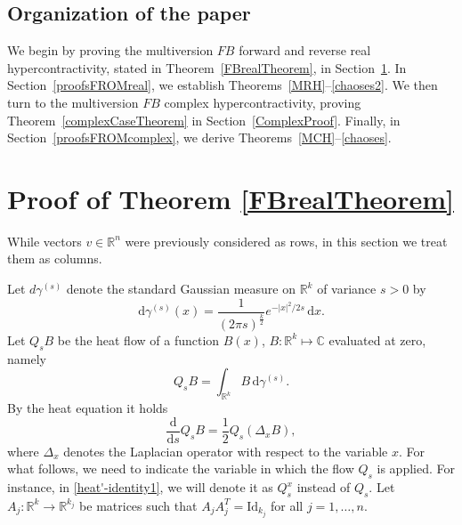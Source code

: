 \documentclass[9pt, a4paper]{amsart}
\newcommand{\R}{\mathbb{R}}
\newcommand{\1}{{\chi_{}}}%
\numberwithin{equation}{section}
\begin{document}
\subsection{Organization of the paper}

We begin by proving the multiversion $FB$ forward and reverse real hypercontractivity, stated in Theorem~\ref{FBrealTheorem}, in Section~\ref{reverseProof}. In Section~\ref{proofsFROMreal}, we establish Theorems~\ref{MRH}--\ref{chaoses2}. We then turn to the multiversion $FB$ complex hypercontractivity, proving Theorem~\ref{complexCaseTheorem} in Section~\ref{ComplexProof}. Finally, in Section~\ref{proofsFROMcomplex}, we derive Theorems~\ref{MCH}--\ref{chaoses}.





\section{\textbf{Proof of Theorem \ref{FBrealTheorem}}}\label{reverseProof}

While vectors $v \in \mathbb{R}^{n}$ were previously considered as rows, in this section we treat them as columns.
 
Let $d\gamma^{(s)}$ denote the  standard Gaussian measure on $\R^k$ of variance $s>0$ by
\begin{equation*}
\mathrm{d}\gamma^{(s)}(x)=\frac{1}{(2\pi s)^{\frac{k}{2}}}e^{-|x|^2/2s}\,\mathrm{d}x. 
\end{equation*}	
Let $Q_sB$ be the heat flow of a function $B(x)$,  $B:\R^k \mapsto \mathbb{C}$ evaluated at zero, namely 
\begin{equation}\label{heat flow}
	Q_sB=\int_{\R^k} 
	B\,\mathrm{d}\gamma^{(s)}.
\end{equation}
By the heat equation it holds
\begin{equation}\label{heat'-identity1}
	\frac{\mathrm{d}}{\mathrm{d}s}Q_sB=\frac{1}{2}Q_s(\Delta_x B),
\end{equation}
where $\Delta_x$ denotes the Laplacian operator with respect to the variable $x$. For what follows, we need to indicate the variable in which the flow $Q_s$ is applied. For instance, in \eqref{heat'-identity1}, we will denote it as $Q_s^x$ instead of $Q_s$. Let $A_{j} : \mathbb{R}^{k}\to \mathbb{R}^{k_{j}}$ be matrices such that $A_{j}A^{T}_{j}=\mathrm{Id}_{k_{j}}$ for all $j=1, \ldots, n$. 
\end{document}
